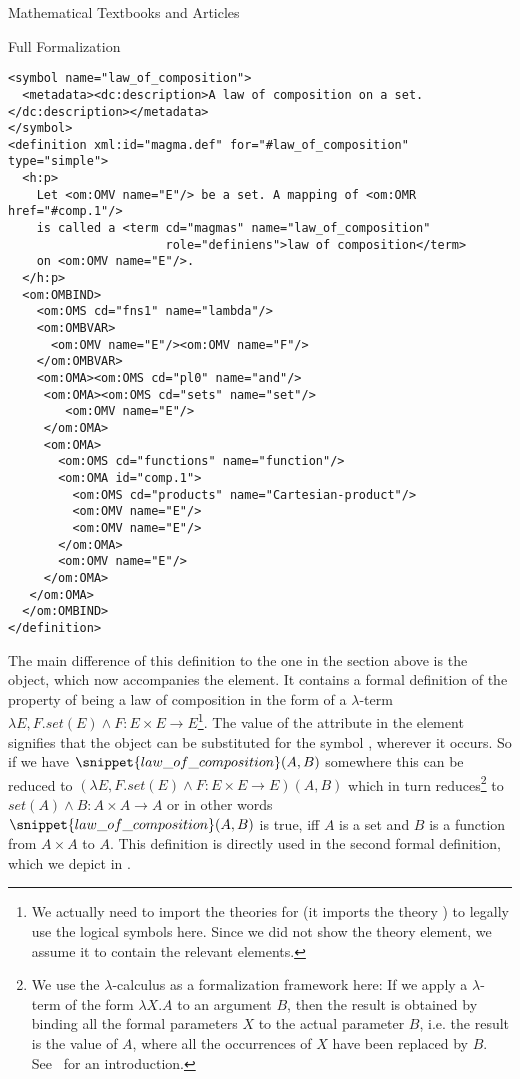 \begin{omgroup}[short=Textbooks and Articles,id=algebra]{Mathematical Textbooks and Articles}
\begin{omgroup}[id=algebra.formalization]{Full Formalization}
\begin{lstlisting}[label=lst:law_of_composition-formal,
    caption={The formal definition of a law of composition},
    index={definition,h:p,OMBIND,OMBVAR,OMS,OMA,OMV}]
<symbol name="law_of_composition">
  <metadata><dc:description>A law of composition on a set.</dc:description></metadata>
</symbol>
<definition xml:id="magma.def" for="#law_of_composition" type="simple">
  <h:p> 
    Let <om:OMV name="E"/> be a set. A mapping of <om:OMR href="#comp.1"/>
    is called a <term cd="magmas" name="law_of_composition" 
                      role="definiens">law of composition</term>
    on <om:OMV name="E"/>.
  </h:p>
  <om:OMBIND>
    <om:OMS cd="fns1" name="lambda"/>
    <om:OMBVAR>
      <om:OMV name="E"/><om:OMV name="F"/>
    </om:OMBVAR>
    <om:OMA><om:OMS cd="pl0" name="and"/>
     <om:OMA><om:OMS cd="sets" name="set"/>
        <om:OMV name="E"/>
     </om:OMA>
     <om:OMA>
       <om:OMS cd="functions" name="function"/>
       <om:OMA id="comp.1">
         <om:OMS cd="products" name="Cartesian-product"/>
         <om:OMV name="E"/>
         <om:OMV name="E"/>
       </om:OMA>
       <om:OMV name="E"/>
     </om:OMA>
   </om:OMA>
  </om:OMBIND>
</definition>
\end{lstlisting}

  \noindent The main difference of this definition to the one in the section above is the
  {\openmath} object, which now accompanies the {} element. It contains a
  formal definition of the property of being a law of composition in the form of a
  $\lambda$-term $\lambda{E,F}.set(E)\wedge F:E\times E\to E$\footnote{We actually need to
    import the theories {} for {} (it imports the
    theory {}) to legally use the logical symbols here. Since we did not show
    the theory element, we assume it to contain the relevant {}
    elements.}. The value {} of the
  {} attribute in the {} element signifies
  that the {\openmath} object can be substituted for the symbol
  {}, wherever it occurs. So if we have
  $\snippet{law\_of\_composition}(A,B)$ somewhere this can be reduced to
  $(\lambda{E,F}.set(E)\wedge F:E\times E\to E)(A,B)$ which in turn reduces\footnote{We
    use the $\lambda$-calculus as a formalization framework here: If we apply a
    $\lambda$-term of the form $\lambda{X}.A$ to an argument $B$, then the result is
    obtained by binding all the formal parameters $X$ to the actual parameter $B$,
    i.e. the result is the value of $A$, where all the occurrences of $X$ have been
    replaced by $B$.  See~\cite{Barendregt80,Andrews02} for an introduction.} to
  $set(A)\wedge B:A\times A\to A$ or in other words $\snippet{law\_of\_composition}(A,B)$
  is true, iff $A$ is a set and $B$ is a function from $A\times A$ to $A$. This definition
  is directly used in the second formal definition, which we depict in
  {}.


\end{omgroup}
\end{omgroup}
